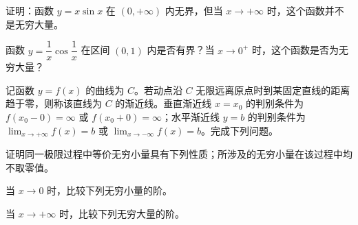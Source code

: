 \noindent\begin{minipage}{\textwidth}
证明：函数 $y=x\sin x$ 在 $(0,+\infty)$ 内无界，但当 $x\to+\infty$ 时，这个函数并不是无穷大量。
\end{minipage}\par\vfill
\noindent\begin{minipage}{\textwidth}
函数 $y=\dfrac1x\cos\dfrac1x$ 在区间 $(0,1)$ 内是否有界？当 $x\to0^+$ 时，这个函数是否为无穷大量？
\end{minipage}\par\vfill
\newpage
\noindent\begin{minipage}{\textwidth}
记函数 $y=f(x)$ 的曲线为 $C$。若动点沿 $C$ 无限远离原点时到某固定直线的距离趋于零，则称该直线为 $C$ 的渐近线。垂直渐近线 $x=x_0$ 的判别条件为 $f(x_0-0)=\infty$ 或 $f(x_0+0)=\infty$；水平渐近线 $y=b$ 的判别条件为 $\lim_{x\to+\infty}f(x)=b$ 或 $\lim_{x\to-\infty}f(x)=b$。完成下列问题。
\end{minipage}\par\vfill
\newpage
\noindent\begin{minipage}{\textwidth}
证明同一极限过程中等价无穷小量具有下列性质；所涉及的无穷小量在该过程中均不取零值。
\end{minipage}\par\vfill
\noindent\begin{minipage}{\textwidth}
当 $x\to0$ 时，比较下列无穷小量的阶。
\end{minipage}\par\vfill
\noindent\begin{minipage}{\textwidth}
当 $x\to+\infty$ 时，比较下列无穷大量的阶。
\end{minipage}\par\vfill
